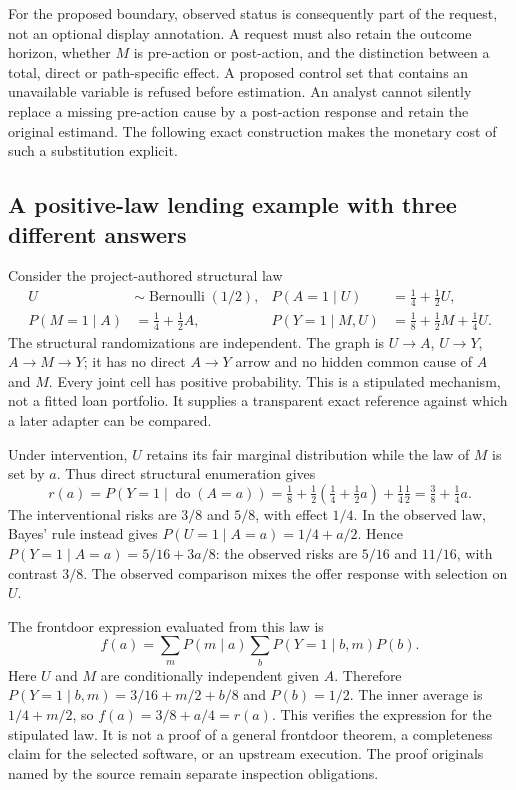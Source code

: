 For the proposed boundary, observed status is consequently part of the request,
not an optional display annotation. A request must also retain the outcome
horizon, whether $M$ is pre-action or post-action, and the distinction between a
total, direct or path-specific effect. A proposed control set that contains an
unavailable variable is refused before estimation. An analyst cannot silently
replace a missing pre-action cause by a post-action response and retain the
original estimand. The following exact construction makes the monetary cost of
such a substitution explicit.~\citep{exec19_otherid_reference}

\subsection{A positive-law lending example with three different answers}
\label{exec19:otherid-law}
Consider the project-authored structural law
\begin{align}
 U&\sim\operatorname{Bernoulli}(1/2), &
 P(A=1\mid U)&=\tfrac14+\tfrac12U,\nonumber\\
 P(M=1\mid A)&=\tfrac14+\tfrac12A, &
 P(Y=1\mid M,U)&=\tfrac18+\tfrac12M+\tfrac14U.
 \label{exec19:otherid-structural}
\end{align}
The structural randomizations are independent. The graph is
$U\to A$, $U\to Y$, $A\to M\to Y$; it has no direct $A\to Y$ arrow
and no hidden common cause of $A$ and $M$. Every joint cell has positive
probability. This is a stipulated mechanism, not a fitted loan portfolio.
It supplies a transparent exact reference against which a later adapter can
be compared.~\citep{exec19_otherid_reference}

Under intervention, $U$ retains its fair marginal distribution while the law
of $M$ is set by $a$. Thus direct structural enumeration gives
\begin{equation}
 r(a)=P(Y=1\mid\operatorname{do}(A=a))
 =\tfrac18+\tfrac12(\tfrac14+\tfrac12a)+\tfrac14\tfrac12
 =\tfrac38+\tfrac14a.
 \label{exec19:otherid-risks}
\end{equation}
The interventional risks are $3/8$ and $5/8$, with effect $1/4$. In the
observed law, Bayes' rule instead gives $P(U=1\mid A=a)=1/4+a/2$. Hence
$P(Y=1\mid A=a)=5/16+3a/8$: the observed risks are $5/16$ and $11/16$,
with contrast $3/8$. The observed comparison mixes the offer response with
selection on $U$.~\citep{exec19_otherid_reference}

The frontdoor expression evaluated from this law is
\begin{equation}
 f(a)=\sum_m P(m\mid a)\sum_b P(Y=1\mid b,m)P(b).
 \label{exec19:otherid-frontdoor}
\end{equation}
Here $U$ and $M$ are conditionally independent given $A$. Therefore
$P(Y=1\mid b,m)=3/16+m/2+b/8$ and $P(b)=1/2$. The inner average is
$1/4+m/2$, so $f(a)=3/8+a/4=r(a)$. This verifies the expression for
the stipulated law. It is not a proof of a general frontdoor theorem, a
completeness claim for the selected software, or an upstream execution. The
proof originals named by the source remain separate inspection obligations.
\citep{exec19_otherid_reference,exec19_otherid_julia}

